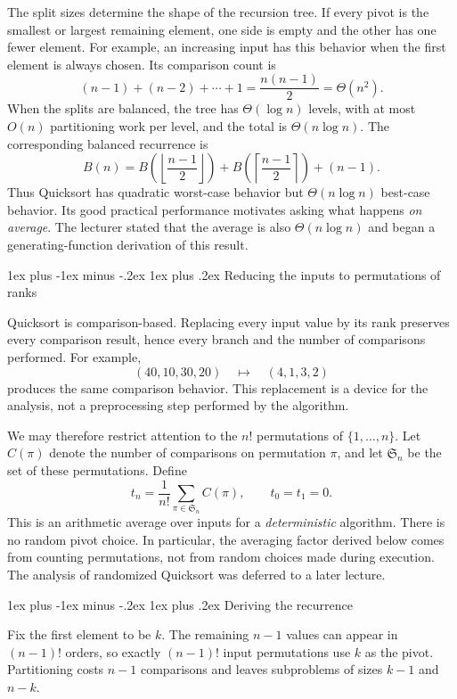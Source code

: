 \documentclass[11pt]{article}
\makeatletter
\renewcommand{\subsection}{\@startsection{subsection}{2}{0mm}%
                                     {1ex plus -1ex minus -.2ex}%
                                     {1ex plus .2ex}%
                                     {\normalfont\large\bfseries}}%
\makeatother
\begin{document}
The split sizes determine the shape of the recursion tree. If every pivot is
the smallest or largest remaining element, one side is empty and the other has
one fewer element. For example, an increasing input has this behavior when the
first element is always chosen. Its comparison count is
\[
 (n-1)+(n-2)+\cdots+1=\frac{n(n-1)}{2}=\Theta(n^2).
\]
When the splits are balanced, the tree has $\Theta(\log n)$ levels, with at
most $O(n)$ partitioning work per level, and the total is $\Theta(n\log n)$.
The corresponding balanced recurrence is
\[
 B(n)=B\!\left(\left\lfloor\frac{n-1}{2}\right\rfloor\right)
     +B\!\left(\left\lceil\frac{n-1}{2}\right\rceil\right)+(n-1).
\]
Thus Quicksort has quadratic worst-case behavior but $\Theta(n\log n)$
best-case behavior. Its good practical performance motivates asking what
happens \emph{on average}. The lecturer stated that the average is also
$\Theta(n\log n)$ and began a generating-function derivation of this result.

\subsection{Reducing the inputs to permutations of ranks}

Quicksort is comparison-based. Replacing every input value by its rank
preserves every comparison result, hence every branch and the number of
comparisons performed. For example,
\[
 (40,10,30,20)\quad\longmapsto\quad(4,1,3,2)
\]
produces the same comparison behavior. This replacement is a device for the
analysis, not a preprocessing step performed by the algorithm.

We may therefore restrict attention to the $n!$ permutations of
$\{1,\ldots,n\}$. Let $C(\pi)$ denote the number of comparisons on permutation
$\pi$, and let $\mathfrak S_n$ be the set of these permutations. Define
\[
 t_n=\frac{1}{n!}\sum_{\pi\in\mathfrak S_n}C(\pi),\qquad t_0=t_1=0.
\]
This is an arithmetic average over inputs for a \emph{deterministic} algorithm.
There is no random pivot choice. In particular, the averaging factor derived
below comes from counting permutations, not from random choices made during
execution. The analysis of randomized Quicksort was deferred to a later lecture.

\subsection{Deriving the recurrence}

Fix the first element to be $k$. The remaining $n-1$ values can appear in
$(n-1)!$ orders, so exactly $(n-1)!$ input permutations use $k$ as the pivot.
Partitioning costs $n-1$ comparisons and leaves subproblems of sizes $k-1$
and $n-k$.
\end{document}
